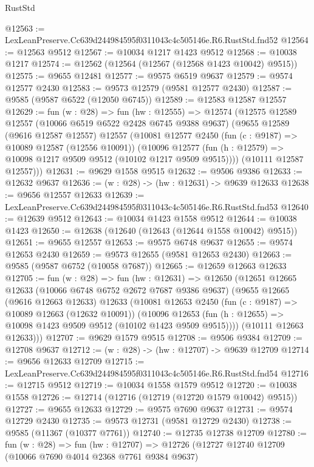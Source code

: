 \begin{lexlean}{RustStd}
\begin{coremodule}
@12563 := LexLeanPreserve.Cc639d244984595f0311043c4c505146e.R6.RustStd.fnd52
@12564 := @12563 @9512
@12567 := @10034 @1217 @1423 @9512
@12568 := @10038 @1217
@12574 := @12562 (@12564 (@12567 (@12568 @1423 @10042) @9515))
@12575 := @9655 @12481
@12577 := @9575 @6519 @9637
@12579 := @9574 @12577 @2430
@12583 := @9573 @12579 (@9581 @12577 @2430)
@12587 := @9585 (@9587 @6522 (@12050 @6745))
@12589 := @12583 @12587 @12557
@12629 := fun (w : @28) =>
  fun (hw : @12555) =>
  @12574
    (@12575
      @12589
      @12557
      (@10066 @6519 @6522 @2428 @6745 @9388 @9637)
      (@9655
        @12589
        (@9616 @12587 @12557)
        @12557
        (@10081
          @12577
          @2450
          (fun (c : @9187) => @10089 @12587 (@12556 @10091))
          (@10096 @12577 (fun (h : @12579) => @10098 @1217 @9509 @9512 (@10102 @1217 @9509 @9515))))
        (@10111 @12587 @12557)))
@12631 := @9629 @1558 @9515
@12632 := @9506 @9386
@12633 := @12632 @9637
@12636 := (w : @28) -> (hw : @12631) -> @9639 @12633
@12638 := @9656 @12557 @12633
@12639 := LexLeanPreserve.Cc639d244984595f0311043c4c505146e.R6.RustStd.fnd53
@12640 := @12639 @9512
@12643 := @10034 @1423 @1558 @9512
@12644 := @10038 @1423
@12650 := @12638 (@12640 (@12643 (@12644 @1558 @10042) @9515))
@12651 := @9655 @12557
@12653 := @9575 @6748 @9637
@12655 := @9574 @12653 @2430
@12659 := @9573 @12655 (@9581 @12653 @2430)
@12663 := @9585 (@9587 @6752 (@10058 @7687))
@12665 := @12659 @12663 @12633
@12705 := fun (w : @28) =>
  fun (hw : @12631) =>
  @12650
    (@12651
      @12665
      @12633
      (@10066 @6748 @6752 @2672 @7687 @9386 @9637)
      (@9655
        @12665
        (@9616 @12663 @12633)
        @12633
        (@10081
          @12653
          @2450
          (fun (c : @9187) => @10089 @12663 (@12632 @10091))
          (@10096 @12653 (fun (h : @12655) => @10098 @1423 @9509 @9512 (@10102 @1423 @9509 @9515))))
        (@10111 @12663 @12633)))
@12707 := @9629 @1579 @9515
@12708 := @9506 @9384
@12709 := @12708 @9637
@12712 := (w : @28) -> (hw : @12707) -> @9639 @12709
@12714 := @9656 @12633 @12709
@12715 := LexLeanPreserve.Cc639d244984595f0311043c4c505146e.R6.RustStd.fnd54
@12716 := @12715 @9512
@12719 := @10034 @1558 @1579 @9512
@12720 := @10038 @1558
@12726 := @12714 (@12716 (@12719 (@12720 @1579 @10042) @9515))
@12727 := @9655 @12633
@12729 := @9575 @7690 @9637
@12731 := @9574 @12729 @2430
@12735 := @9573 @12731 (@9581 @12729 @2430)
@12738 := @9585 (@11367 (@10377 @7761))
@12740 := @12735 @12738 @12709
@12780 := fun (w : @28) =>
  fun (hw : @12707) =>
  @12726
    (@12727
      @12740
      @12709
      (@10066 @7690 @4014 @2368 @7761 @9384 @9637)

\end{coremodule}
\end{lexlean}
